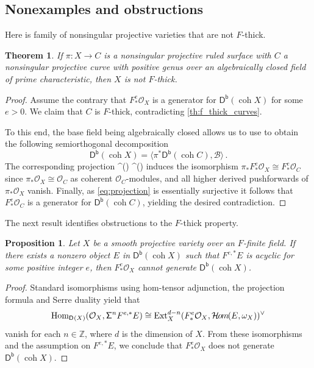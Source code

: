 \documentclass{amsart}
\let\oldequation\equation
\let\oldendequation\endequation
\renewenvironment{equation}{\linenomathNonumbers\oldequation}{\oldendequation\endlinenomath}
\newcommand{\dcat}[2][]{\cat{D}_{#1}(#2)}
\newcommand{\coh}{\operatorname{coh}}
\newcommand{\dbcat}[1]{\cat{D}^{\mathsf{b}}(#1)}
\newcommand{\mco}{\mathcal{O}}
\newcommand{\cat}[1]{{\mathsf{#1}}}
\newcommand{\Ext}{\operatorname{Ext}}
\newcommand{\SheafHom}{\mathcal{H}\kern -1pt o\kern -1 pt m\kern -1pt}
\newcommand{\Hom}{\operatorname{Hom}}
\newcommand{\shift}{{\sf\Sigma}}
\newtheorem{theorem}[subsection]{Theorem}
\newtheorem{proposition}[subsection]{Proposition}
\theoremstyle{definition}
\theoremstyle{remark}
\numberwithin{equation}{subsection}
\begin{document}
\subsection*{Nonexamples and obstructions} 
Here is family of nonsingular projective varieties that are not $F$-thick.

\begin{theorem}
\label{th:ruled_surface_f_thick}
If $\pi \colon X \to C$ is a nonsingular projective ruled surface with $C$ a nonsingular projective curve with positive genus over an algebraically closed field of prime characteristic, then $X$ is not $F$-thick.
\end{theorem}
	
\begin{proof}
Assume the contrary that $F_*^e \mco_X$ is a generator for $\dbcat{\coh{X}}$ for some $e>0$. We claim that $C$ is $F$-thick, contradicting \cref{th:f_thick_curves}. 
	
To this end, the base field being algebraically closed allows us to use \cite[Theorem~2.6]{Orlov:1993} to obtain the following semiorthogonal decomposition 
\[
\dbcat{\coh{X}} = \langle \pi^*\dbcat{\coh{C}}, \mathcal{B}
\rangle\,.
\]
The corresponding projection 
\begin{equation}\label{eq:projection}
\dbcat{\coh{X}} \to \dbcat{\coh{C}}
\end{equation}
induces the isomorphism $\pi_* F_*^e \mco_X \cong F_*^e
\mco_C$ since $\pi_* \mco_X \cong \mco_C$ as coherent $\mco_C$-modules, and all higher derived pushforwards of $\pi_* \mco_X$ vanish. Finally, as \cref{eq:projection} is essentially surjective it follows that $F_*^e \mco_C$ is a generator for $\dbcat{\coh{C}}$, yielding the desired contradiction.
\end{proof}

The next result identifies obstructions to the $F$-thick property.
	
\begin{proposition}\label{pr:vanishing_f_pullback}
Let $X$ be a smooth projective variety over an $F$-finite field.  If there exists a nonzero object $E$ in  $\dbcat{\coh{X}}$ such that $F^{e,*}E$ is acyclic for some positive integer $e$, then $F_*^e \mco_X$ cannot generate $\dbcat{\coh{X}}$.
\end{proposition}

\begin{proof}
Standard isomorphisms using hom-tensor adjunction, the projection formula and Serre duality yield that
\[
 \Hom_{\dcat{X}} (\mco_X, \shift^n F^{e,*} E)\cong \Ext^{d-n}_X ( F_*^e \mco_X,\SheafHom(E,\omega_X) )^\vee
\]
vanish for each $n\in \mathbb{Z}$, where $d$ is the dimension of $X$. From these isomorphisms and the assumption on $F^{e,*}E$, we conclude that $F_*^e \mco_X$ does not generate  $\dbcat{\coh X}$.
\end{proof}
\end{document}
